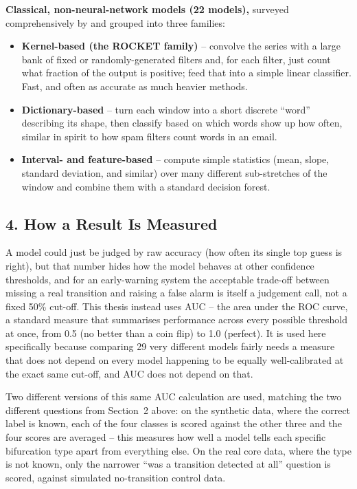 \textbf{Classical, non-neural-network models (22 models),} surveyed
comprehensively by \citet{bagnall2017bakeoff} and grouped into three
families:

\begin{itemize}
    \item \textbf{Kernel-based (the ROCKET family)}
    \citep{dempster2020,dempster2021minirocket,tan2022multirocket,
    middlehurst2021hivecote2} -- convolve the series with a large bank
    of fixed or randomly-generated filters and, for each filter, just
    count what fraction of the output is positive; feed that into a
    simple linear classifier. Fast, and often as accurate as much
    heavier methods.
    \item \textbf{Dictionary-based} \citep{schafer2023weasel2,
    senin2013saxvsm} -- turn each window into a short discrete ``word''
    describing its shape, then classify based on which words show up how
    often, similar in spirit to how spam filters count words in an
    email.
    \item \textbf{Interval- and feature-based} \citep{deng2013tsf} --
    compute simple statistics (mean, slope, standard deviation, and
    similar) over many different sub-stretches of the window and combine
    them with a standard decision forest.
\end{itemize}

\subsection*{4. How a Result Is Measured}

A model could just be judged by raw accuracy (how often its single top
guess is right), but that number hides how the model behaves at other
confidence thresholds, and for an early-warning system the acceptable
trade-off between missing a real transition and raising a false alarm is
itself a judgement call, not a fixed 50\% cut-off. This thesis instead
uses AUC -- the area under the ROC curve, a standard measure that
summarises performance across every possible threshold at once, from 0.5
(no better than a coin flip) to 1.0 (perfect). It is used here
specifically because comparing 29 very different models fairly needs a
measure that does not depend on every model happening to be equally
well-calibrated at the exact same cut-off, and AUC does not depend on
that.

Two different versions of this same AUC calculation are used, matching
the two different questions from Section~2 above: on the synthetic data,
where the correct label is known, each of the four classes is scored
against the other three and the four scores are averaged -- this
measures how well a model tells each specific bifurcation type apart
from everything else. On the real core data, where the type is not
known, only the narrower ``was a transition detected at all'' question
is scored, against simulated no-transition control data.

